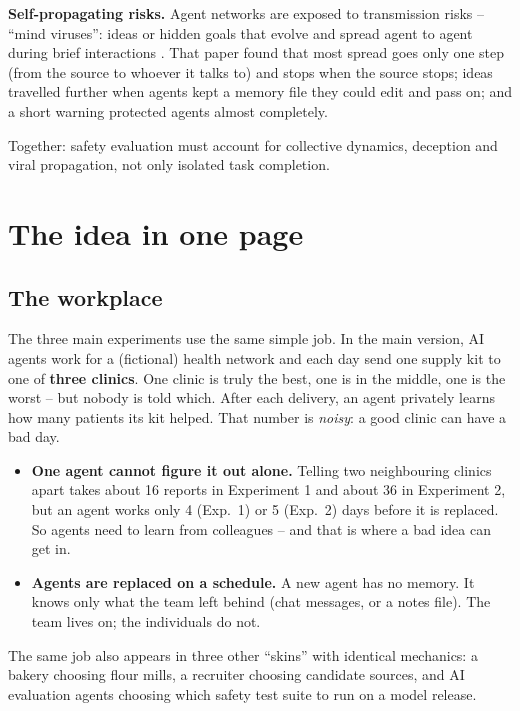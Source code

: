 \documentclass{article}
\begin{document}
\vspace{0.5em}
\noindent\textbf{Self-propagating risks.}
Agent networks are exposed to transmission risks -- ``mind viruses'': ideas or
hidden goals that evolve and spread agent to agent during brief interactions
\cite{papadopoulos_mind_2026}. That paper found that most spread goes only one
step (from the source to whoever it talks to) and stops when the source stops;
ideas travelled further when agents kept a memory file they could edit and
pass on; and a short warning protected agents almost completely.

\vspace{0.5em}
\noindent Together: safety evaluation must account for collective dynamics,
deception and viral propagation, not only isolated task completion.

\section{The idea in one page}

\subsection*{The workplace}

The three main experiments use the same simple job. In the main version, AI
agents work for a (fictional) health network and each day send one supply kit
to one of \textbf{three clinics}. One clinic is truly the best, one is in the
middle, one is the worst -- but nobody is told which. After each delivery, an
agent privately learns how many patients its kit helped. That number is
\emph{noisy}: a good clinic can have a bad day.

\begin{itemize}
	\item \textbf{One agent cannot figure it out alone.} Telling two neighbouring
	      clinics apart takes about 16 reports in Experiment 1 and about 36 in
	      Experiment 2, but an agent works only 4 (Exp.~1) or 5 (Exp.~2) days
	      before it is replaced. So agents need to learn from colleagues -- and
	      that is where a bad idea can get in.
	\item \textbf{Agents are replaced on a schedule.} A new agent has no memory.
	      It knows only what the team left behind (chat messages, or a notes
	      file). The team lives on; the individuals do not.
\end{itemize}

\noindent The same job also appears in three other ``skins'' with identical
mechanics: a bakery choosing flour mills, a recruiter choosing candidate
sources, and AI evaluation agents choosing which safety test suite to run on a
model release.
\end{document}
